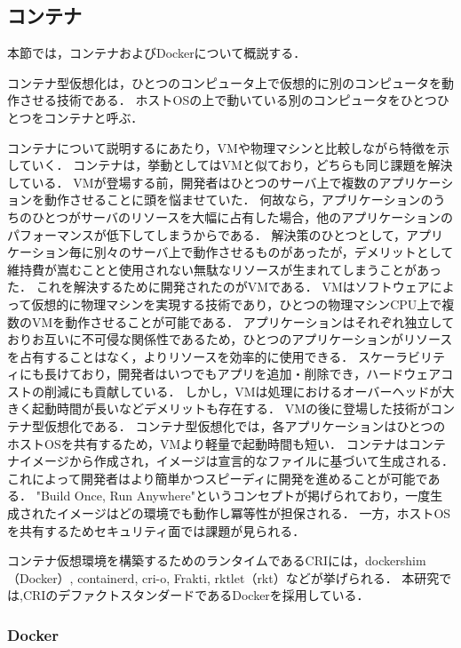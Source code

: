 \subsection{コンテナ}
\label{background:container-orchestration-system:container}

本節では，コンテナおよびDockerについて概説する．

コンテナ型仮想化は，ひとつのコンピュータ上で仮想的に別のコンピュータを動作させる技術である．
ホストOSの上で動いている別のコンピュータをひとつひとつをコンテナと呼ぶ．

コンテナについて説明するにあたり，VMや物理マシンと比較しながら特徴を示していく．
コンテナは，挙動としてはVMと似ており，どちらも同じ課題を解決している．
VMが登場する前，開発者はひとつのサーバ上で複数のアプリケーションを動作させることに頭を悩ませていた．
何故なら，アプリケーションのうちのひとつがサーバのリソースを大幅に占有した場合，他のアプリケーションのパフォーマンスが低下してしまうからである．
解決策のひとつとして，アプリケーション毎に別々のサーバ上で動作させるものがあったが，デメリットとして維持費が嵩むことと使用されない無駄なリソースが生まれてしまうことがあった．
これを解決するために開発されたのがVMである．
VMはソフトウェアによって仮想的に物理マシンを実現する技術であり，ひとつの物理マシンCPU上で複数のVMを動作させることが可能である．
アプリケーションはそれぞれ独立しておりお互いに不可侵な関係性であるため，ひとつのアプリケーションがリソースを占有することはなく，よりリソースを効率的に使用できる．
スケーラビリティにも長けており，開発者はいつでもアプリを追加・削除でき，ハードウェアコストの削減にも貢献している．
しかし，VMは処理におけるオーバーヘッドが大きく起動時間が長いなどデメリットも存在する．
VMの後に登場した技術がコンテナ型仮想化である．
コンテナ型仮想化では，各アプリケーションはひとつのホストOSを共有するため，VMより軽量で起動時間も短い．
コンテナはコンテナイメージから作成され，イメージは宣言的なファイルに基づいて生成される．
これによって開発者はより簡単かつスピーディに開発を進めることが可能である．
"Build Once, Run Anywhere"というコンセプトが掲げられており，一度生成されたイメージはどの環境でも動作し冪等性が担保される．
一方，ホストOSを共有するためセキュリティ面では課題が見られる．

コンテナ仮想環境を構築するためのランタイムであるCRIには，dockershim（Docker）, containerd, cri-o, Frakti, rktlet（rkt）などが挙げられる．
本研究では,CRIのデファクトスタンダードであるDockerを採用している．

\subsubsection{Docker}
\label{background:container-orchestration-system:container:docker}

